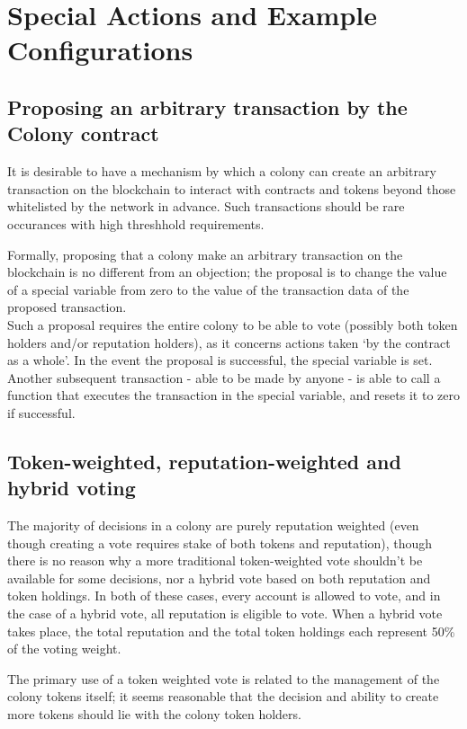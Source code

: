 \section{Special Actions and Example Configurations}\label{sec:special-cases}


\subsection{Proposing an arbitrary transaction by the Colony contract}\label{sec:arbitrary-transaction}
It is desirable to have a mechanism by which a colony can create an arbitrary transaction on the blockchain to interact with contracts and tokens beyond those whitelisted by the network in advance. Such transactions should be rare occurances with high threshhold requirements.

Formally, proposing that a colony make an arbitrary transaction on the blockchain is no different from an objection; the proposal is to change the value of a special variable from zero to the value of the transaction data of the proposed transaction.\\
Such a proposal requires the entire colony to be able to vote (possibly both token holders and/or reputation holders), as it concerns actions taken `by the contract as a whole'. In the event the proposal is successful, the special variable is set. Another subsequent transaction - able to be made by anyone - is able to call a function that executes the transaction in the special variable, and resets it to zero if successful.

\subsection{Token-weighted, reputation-weighted and hybrid voting}
The majority of decisions in a colony are purely reputation weighted (even though creating a vote requires stake of both tokens and reputation), though there is no reason why a more traditional token-weighted vote shouldn't be available for some decisions, nor a hybrid vote based on both reputation and token holdings. In both of these cases, every account is allowed to vote, and in the case of a hybrid vote, all reputation is eligible to vote. When a hybrid vote takes place, the total reputation and the total token holdings each represent 50\% of the voting weight.

The primary use of a token weighted vote is related to the management of the colony tokens itself; it seems reasonable that the decision and ability to create more tokens should lie with the colony token holders.

